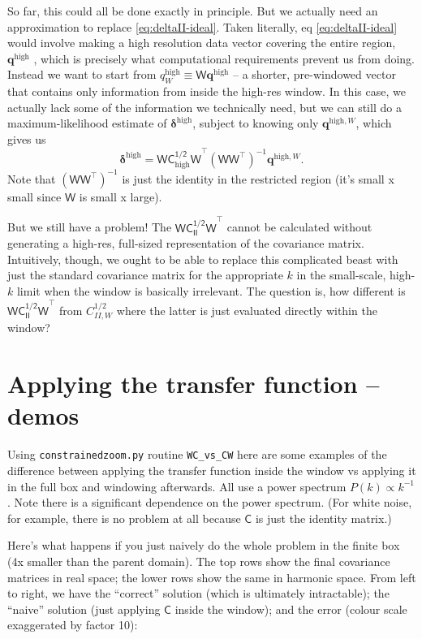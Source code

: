 \documentclass[11pt,a4paper,preprint]{aastex}
\newcommand{\high}{\mathrm{high}}
\newcommand{\bmath}[1]{\ensuremath{\bm{#1}}}
\renewcommand{\vec}[1]{\bmath{#1}}
\begin{document}
So far, this could all be done exactly in principle. But we actually need an approximation to replace \eqref{eq:deltaII-ideal}.
Taken literally, eq  \eqref{eq:deltaII-ideal} would involve making a high
resolution data vector covering the entire region, $\vec{q}^{\high}$ ,
which is precisely what computational requirements prevent us from
doing. Instead we want to start from $q^{\high}_W \equiv
\mathsf{W}\vec{q}^{\high}$ -- a shorter, pre-windowed vector that
contains only information from inside the high-res window. In this
case, we actually lack some of the information we technically need,
but we can still do a maximum-likelihood estimate of
$\vec{\delta}^{\high}$, subject to knowing only $\vec{q}^{\high,W}$, which
gives us
\begin{equation}
\vec{\delta}^{\high} = \mathsf{WC_{\high}^{1/2}W}^{\top} (\mathsf{WW}^{\top})^{-1} \vec{q}^{\high,W} \textrm{.}
\end{equation}
Note that $(\mathsf{WW}^{\top})^{-1}$ is just the identity in the
restricted region (it's small x small since $\mathsf{W}$ is small x large).

But we still have a problem! The $\mathsf{WC_{II}^{1/2}W}^{\top}$
cannot be calculated without generating a high-res, full-sized
representation of the covariance matrix. Intuitively, though, we ought
to be able to replace this complicated beast with just the standard
covariance matrix for the appropriate $k$ in the small-scale, high-$k$
limit when the window is basically irrelevant. The question is, how
different is $\mathsf{WC_{II}^{1/2}W}^{\top}$ from $C_{II,W}^{1/2}$
where the latter is just evaluated directly within the window?


\section{Applying the transfer function -- demos}

Using {\tt constrainedzoom.py} routine {\tt WC\_vs\_CW} here are some
examples of the difference between applying the transfer function
inside the window vs applying it in the full box and windowing
afterwards. All use a power spectrum $P(k) \propto k^{-1}$. Note there
is a significant dependence on the power spectrum. (For white noise,
for example, there is no problem at all because $\mathsf{C}$ is just
the identity matrix.)

Here's what happens if you just naively do the whole problem in the
finite box (4x smaller than the parent domain). The top rows show the
final covariance matrices in real space; the lower rows show the same
in harmonic space. From left to right, we have the ``correct''
solution (which is ultimately intractable); the ``naive'' solution
(just applying $\mathsf{C}$ inside the window); and the error (colour
scale exaggerated by factor 10):
\end{document}
